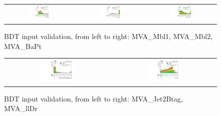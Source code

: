 \begin{figure}[tbh!]
 \begin{center}
 \begin{tabular}{ccc}
  \includegraphics[width=0.325\textwidth]{figures/Part3/BDT/Mbl1}&
    \includegraphics[width=0.325\textwidth]{figures/Part3/BDT/Mbl2}&
  \includegraphics[width=0.325\textwidth]{figures/Part3/BDT/BaPt}\\
 \end{tabular}
 \caption{BDT input validation, from left to right: MVA\_Mbl1, MVA\_Mbl2, MVA\_BaPt}
 \label{fig:input_vali_6}
 \end{center}
\end{figure}

\begin{figure}[tbh!]
 \begin{center}
 \begin{tabular}{cc}
  \includegraphics[width=0.325\textwidth]{figures/Part3/BDT/Jet2Btag}&
  \includegraphics[width=0.325\textwidth]{figures/Part3/BDT/llDr}\\
 \end{tabular}
 \caption{BDT input validation, from left to right: MVA\_Jet2Btag, MVA\_llDr}
 \label{fig:input_vali_7}
 \end{center}
\end{figure}
